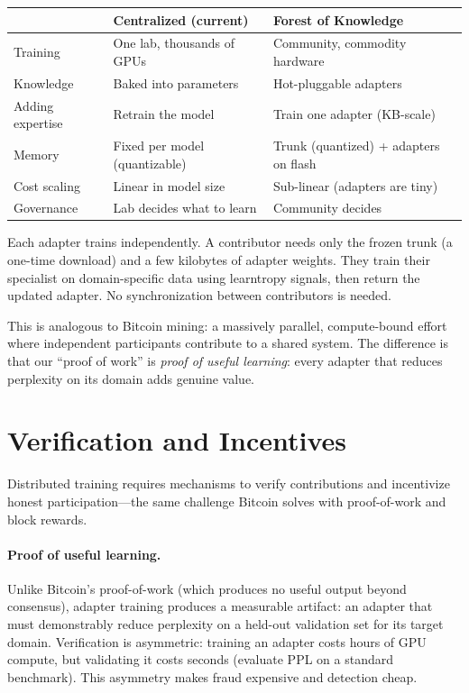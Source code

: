 \documentclass[11pt]{article}
\begin{document}
\begin{center}
\begin{tabular}{@{}lll@{}}
\toprule
& \textbf{Centralized (current)} & \textbf{Forest of Knowledge} \\
\midrule
Training & One lab, thousands of GPUs & Community, commodity hardware \\
Knowledge & Baked into parameters & Hot-pluggable adapters \\
Adding expertise & Retrain the model & Train one adapter (KB-scale) \\
Memory & Fixed per model (quantizable) & Trunk (quantized) + adapters on flash \\
Cost scaling & Linear in model size & Sub-linear (adapters are tiny) \\
Governance & Lab decides what to learn & Community decides \\
\bottomrule
\end{tabular}
\end{center}

Each adapter trains independently. A contributor needs only the frozen trunk
(a one-time download) and a few kilobytes of adapter weights. They train
their specialist on domain-specific data using learntropy signals, then
return the updated adapter. No synchronization between contributors is
needed.

This is analogous to Bitcoin mining: a massively parallel, compute-bound
effort where independent participants contribute to a shared system. The
difference is that our ``proof of work'' is \emph{proof of useful learning}:
every adapter that reduces perplexity on its domain adds genuine value.

\section{Verification and Incentives}

Distributed training requires mechanisms to verify contributions and
incentivize honest participation---the same challenge Bitcoin solves with
proof-of-work and block rewards.

\paragraph{Proof of useful learning.}
Unlike Bitcoin's proof-of-work (which produces no useful output beyond
consensus), adapter training produces a measurable artifact: an adapter that
must demonstrably reduce perplexity on a held-out validation set for its
target domain. Verification is asymmetric: training an adapter costs hours
of GPU compute, but validating it costs seconds (evaluate PPL on a standard
benchmark). This asymmetry makes fraud expensive and detection cheap.
\end{document}
